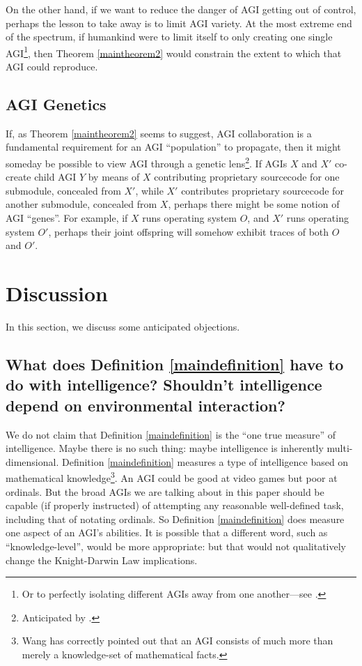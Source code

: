\documentclass[runningheads]{llncs}
\begin{document}
On the other hand, if we want to reduce the danger of AGI getting out of control,
perhaps the lesson to take away is to limit AGI variety. At the most extreme end
of the spectrum, if humankind were to limit itself to only creating one single
AGI\footnote{Or to perfectly isolating
different AGIs away from
one another---see \cite{yampolskiy2012leakproofing}.}, then
Theorem \ref{maintheorem2} would constrain the extent to which
that AGI could reproduce.


\subsection{AGI Genetics}

If, as Theorem \ref{maintheorem2} seems to suggest, AGI collaboration
is a fundamental requirement for an AGI ``population'' to propagate, then it might
someday be possible to view AGI through a genetic lens\footnote{Anticipated
by \cite{buchanan1988artificial}.}. If AGIs $X$ and $X'$ co-create child AGI $Y$ by
means of $X$ contributing proprietary sourcecode for one submodule, concealed from $X'$,
while $X'$ contributes proprietary sourcecode for another submodule, concealed from $X$,
perhaps there might be some notion of AGI ``genes''. For example, if $X$ runs operating
system $O$, and $X'$ runs operating system $O'$, perhaps their joint offspring
will somehow exhibit traces of both $O$ and $O'$.


\section{Discussion}
\label{objectionsection}

In this section, we discuss some anticipated objections.

\subsection{What does Definition \ref{maindefinition} have to do with intelligence?
Shouldn't intelligence depend on environmental interaction?}

We do not claim that Definition \ref{maindefinition} is the ``one true measure'' of
intelligence. Maybe there is no such thing: maybe intelligence is inherently
multi-dimensional. Definition \ref{maindefinition} measures a type of
intelligence based on mathematical knowledge\footnote{Wang has
correctly pointed out \cite{wang2007} that an AGI consists of much more than merely
a knowledge-set of mathematical facts.}. An AGI could be good at video games
but poor at ordinals. But the broad AGIs we are talking about in this paper
should be capable (if properly
instructed) of attempting any reasonable well-defined task, including that of
notating ordinals. So Definition \ref{maindefinition} does
measure one aspect of an AGI's abilities. It is possible that
a different word, such as
``knowledge-level'', would be more appropriate: but
that would not qualitatively change
the Knight-Darwin Law implications.
\end{document}
